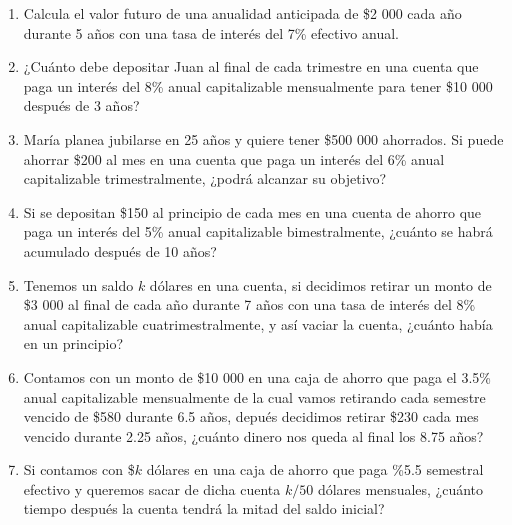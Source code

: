 \documentclass{article}
\begin{document}
\begin{enumerate}
    \item Calcula el valor futuro de una anualidad anticipada de \$2 000 cada año durante 5 años con una tasa de interés del 7\% efectivo anual.
    
    
    \item ¿Cuánto debe depositar Juan al final de cada trimestre en una cuenta que paga un interés del 8\% anual capitalizable mensualmente para tener \$10 000 después de 3 años?
    
    
    \item María planea jubilarse en 25 años y quiere tener \$500 000 ahorrados. Si puede ahorrar \$200 al mes en una cuenta que paga un interés del 6\% anual capitalizable trimestralmente, ¿podrá alcanzar su objetivo?
    
    
    \item Si se depositan \$150 al principio de cada mes en una cuenta de ahorro que paga un interés del 5\% anual capitalizable bimestralmente, ¿cuánto se habrá acumulado después de 10 años?
    
    
    \item Tenemos un saldo $k$ dólares en una cuenta, si decidimos retirar un monto de \$3 000 al final de cada año durante 7 años con una tasa de interés del 8\% anual capitalizable cuatrimestralmente, y así vaciar la cuenta, ¿cuánto había en un principio?
    
    \item Contamos con un monto de \$10 000 en una caja de ahorro que paga el 3.5\% anual capitalizable mensualmente de la cual vamos retirando cada semestre vencido de \$580 durante 6.5 años, depués decidimos retirar \$230 cada mes vencido durante 2.25 años, ¿cuánto dinero nos queda al final los 8.75 años?
    \item Si contamos con \$$k$ dólares en una caja de ahorro que paga \%5.5 semestral efectivo y queremos sacar de dicha cuenta $k/50$ dólares mensuales, ¿cuánto tiempo después la cuenta tendrá la mitad del saldo inicial?
    
    
\end{enumerate}
\end{document}
